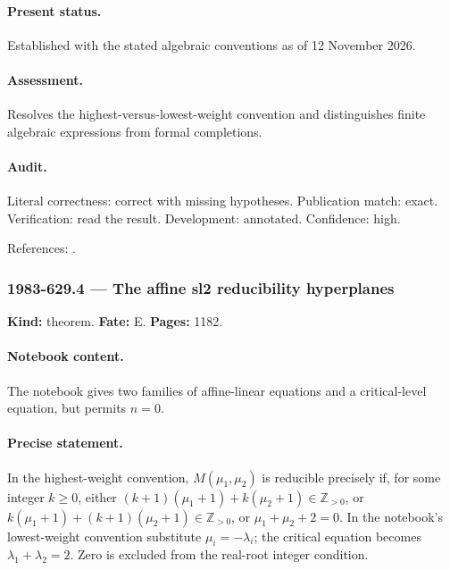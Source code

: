 \paragraph{Present status.} Established with the stated algebraic conventions as of 12 November 2026.

\paragraph{Assessment.} Resolves the highest-versus-lowest-weight convention and distinguishes finite algebraic expressions from formal completions.

\paragraph{Audit.} Literal correctness: correct with missing hypotheses. Publication match: exact. Verification: read the result. Development: annotated. Confidence: high.

\noindent References: \citep{malikovfeiginfuchs1986singular}.\par

\subsubsection{1983-629.4 --- The affine sl2 reducibility hyperplanes}

\label{item:1983-629.4}

\noindent\textbf{Kind:} theorem. \textbf{Fate:} E. \textbf{Pages:} 1182.\par

\paragraph{Notebook content.} The notebook gives two families of affine-linear equations and a critical-level equation, but permits \(n=0\).

\paragraph{Precise statement.} In the highest-weight convention, \(M(\mu_1,\mu_2)\) is reducible precisely if, for some integer \(k\ge0\), either \((k+1)(\mu_1+1)+k(\mu_2+1)\in\mathbb Z_{>0}\), or \(k(\mu_1+1)+(k+1)(\mu_2+1)\in\mathbb Z_{>0}\), or \(\mu_1+\mu_2+2=0\). In the notebook’s lowest-weight convention substitute \(\mu_i=-\lambda_i\); the critical equation becomes \(\lambda_1+\lambda_2=2\). Zero is excluded from the real-root integer condition.

